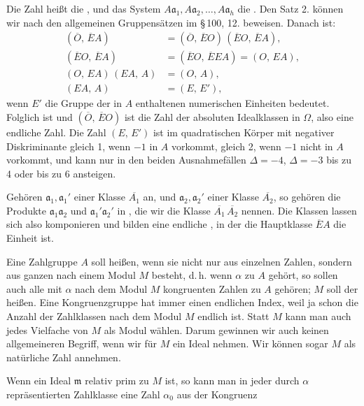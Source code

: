 Die Zahl
heißt die , und das System
$A\mathfrak{a}_1, A\mathfrak{a}_2, \ldots, A\mathfrak{a}_h$ die . Den Satz 2. können
wir nach den allgemeinen Gruppensätzen im \S\,100, 12. beweisen.
Danach ist:
\[
\begin{aligned}
(\overline{O},\, \overline{E}A) &= (\overline{O},\, \overline{E}O)\,(\overline{E}O,\, \overline{E}A), \\
(\overline{E}O,\, \overline{E}A) &= (\overline{E}O,\, \overline{E}EA) = (O,\, EA), \\
(O,\, EA)\,(EA,\, A) &= (O,\, A), \\
(EA,\, A) &= (E,\, E'),
\end{aligned}
\]
wenn $E'$ die Gruppe der in $A$ enthaltenen numerischen Einheiten
bedeutet. Folglich ist
und $(\overline{O},\, \overline{E}O)$ ist die Zahl der absoluten Idealklassen in $\Omega$, also
eine endliche Zahl. Die Zahl $(E,\, E')$ ist im quadratischen Körper
mit negativer Diskriminante gleich 1, wenn $-1$ in $A$ vorkommt,
gleich 2, wenn $-1$ nicht in $A$ vorkommt, und kann nur in den
beiden Ausnahmefällen $\Delta = -4$, $\Delta = -3$ bis zu 4 oder bis
zu 6 ansteigen.

Gehören $\mathfrak{a}_1, \mathfrak{a}_1'$ einer Klasse $\overline{A_1}$ an, und $\mathfrak{a}_2, \mathfrak{a}_2'$ einer Klasse
$\overline{A_2}$, so gehören die Produkte $\mathfrak{a}_1 \mathfrak{a}_2$ und $\mathfrak{a}_1' \mathfrak{a}_2'$ in , die
wir die Klasse $\overline{A_1}\,\overline{A_2}$ nennen. Die Klassen lassen sich also komponieren und
bilden eine endliche , in der die
Hauptklasse $\overline{E}A$ die Einheit ist.

Eine Zahlgruppe $A$ soll  heißen, wenn
sie nicht nur aus einzelnen Zahlen, sondern aus ganzen 
 nach einem Modul $M$ besteht, d.\,h. wenn $\alpha$ zu $A$ gehört,
so sollen auch alle mit $\alpha$ nach dem Modul $M$ kongruenten Zahlen
zu $A$ gehören; $M$ soll der  heißen.
Eine Kongruenzgruppe hat immer einen endlichen Index, weil ja
schon die Anzahl der Zahlklassen nach dem Modul $M$ endlich ist.
Statt $M$ kann man auch jedes Vielfache von $M$ als Modul wählen.
Darum gewinnen wir auch keinen allgemeineren Begriff, wenn
wir für $M$ ein Ideal nehmen. Wir können sogar $M$ als natürliche
Zahl annehmen.

Wenn ein Ideal $\mathfrak{m}$ relativ prim zu $M$ ist, so kann man in
jeder durch $\alpha$ repräsentierten Zahlklasse eine Zahl $\alpha_0$ aus der
Kongruenz
